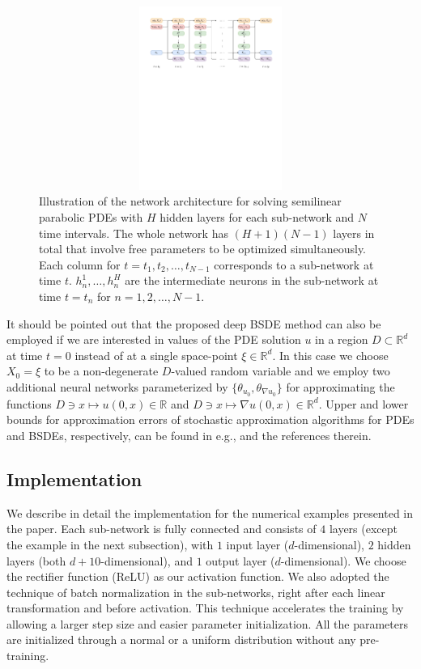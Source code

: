 \documentclass[11pt,english]{article}
\providecommand{\R}{{\ensuremath{\mathbb{R}}}}
\begin{document}
\begin{figure}[ht]
  \centering
  \includegraphics[width=14cm, height=6cm]{nn_architecture.pdf}
  \caption{Illustration of the
 network architecture for solving semilinear parabolic PDEs with $H$ hidden layers for 
each sub-network and $N$ time intervals. The whole network has $(H+1)(N-1)$ layers in total that involve free parameters to be optimized simultaneously. Each column for $ t = t_1, t_2,\dots,t_{N-1}$ corresponds to a sub-network at time $t$.
$h^1_n, \dots, h^H_n$ are the intermediate neurons in the sub-network at time $t=t_n$ for $ n= 1, 2, \dots, N - 1$.}
  \label{fig:nn}
\end{figure}

It should be pointed out that the proposed deep BSDE method
can also be employed if we are interested in values 
of the PDE solution $ u $ in a region $ D \subset \R^d $ 
at time $ t = 0 $ instead of at a single space-point $ \xi \in \R^d $. 
In this case we choose $ X_0 = \xi $ to be a non-degenerate 
$ D $-valued random variable and we employ two 
additional neural networks 
parameterized by 
$\{ \theta_{ u_0 }, \theta_{ \nabla u_0} \} $
for approximating the functions
$D \ni x \mapsto u(0,x) \in \R $ and 
$D \ni x \mapsto \nabla u(0,x) \in \R^d$.
Upper and lower bounds for approximation errors of 
stochastic approximation algorithms for PDEs and BSDEs,
respectively, can be found in e.g., \cite{Heinrich2006,Geiss2014,Gobet2016} and the references therein.

\subsection*{Implementation}
We describe in detail the implementation for the numerical examples presented in the paper. 
Each sub-network is fully connected and consists of $ 4 $ layers (except the example in the next subsection), with $ 1 $ input layer ($ d $-dimensional), $ 2 $ hidden layers (both $ d+10 $-dimensional),
and $ 1 $ output layer ($ d $-dimensional).
We choose the rectifier function (ReLU) 
as our activation function.
We also adopted the technique of batch normalization \cite{Ioffe2015} in the sub-networks, right after each linear transformation and before activation. 
This technique accelerates the training by allowing a larger step size and easier parameter initialization. All the parameters are initialized through a normal or a uniform distribution without any pre-training.
\end{document}
